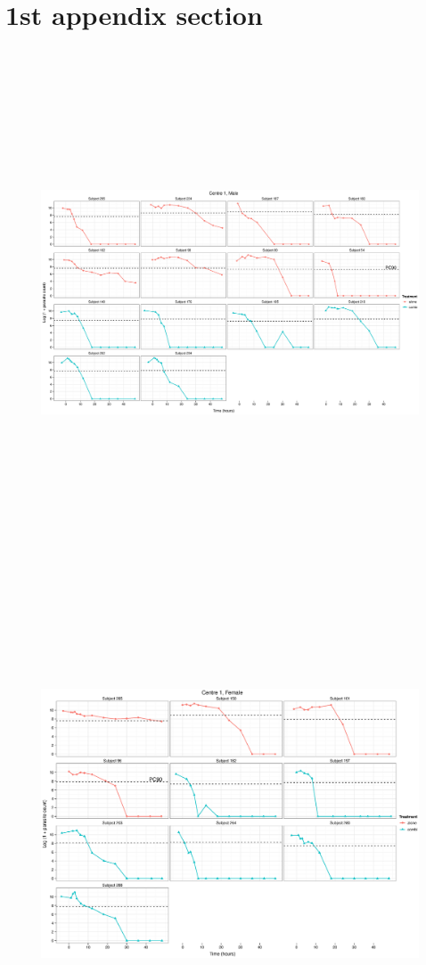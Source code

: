 \renewcommand{\appendixtocname}{TOC appendix title}
\appendix
\appendixpage
\addappheadtotoc
\section{1st appendix section}
\begin{figure}
\includegraphics[height=150mm]{Araw1M.eps}
\end{figure}
\begin{figure}
\includegraphics[height=150mm]{Araw1F.eps}
\end{figure}
